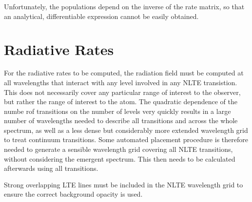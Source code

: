 \documentclass[a4paper]{article}
\begin{document}
Unfortunately, the populations depend on the inverse of the rate matrix, so that an analytical, differentiable expression cannot be easily obtained.

\section{Radiative Rates}

For the radiative rates to be computed, the radiation field must be computed at all wavelengths that interact with any level involved in any NLTE transistion. This does not necessarily cover any particular range of interest to the observer, but rather the range of interest to the atom. The quadratic dependence of the numbe rof transitions on the number of levels very quickly results in a large number of wavelengths needed to describe all transitions and across the whole spectrum, as well as a less dense but considerably more extended wavelength grid to treat continuum transitions. Some automated placement procedure is therefore needed to generate a sensible wavelength grid covering all NLTE transitions, without considering the emergent spectrum. This then needs to be calculated afterwards using all transitions.

Strong overlapping LTE lines must be included in the NLTE wavelength grid to ensure the correct background opacity is used. 
\end{document}

